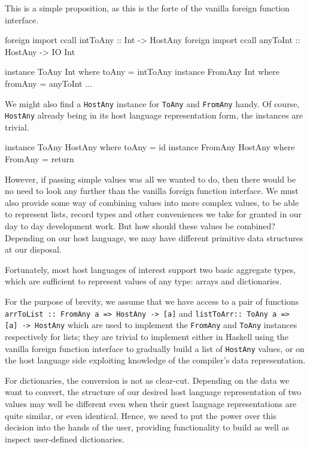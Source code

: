 \documentclass{sigplanconf}
\begin{document}
This is a simple proposition, as this is the forte of the vanilla foreign
function interface.

\begin{code}
  foreign import ccall intToAny :: Int -> HostAny
  foreign import ccall anyToInt :: HostAny -> IO Int

  instance ToAny Int where toAny = intToAny
  instance FromAny Int where fromAny = anyToInt
  ...
\end{code}

We might also find a \lstinline!HostAny! instance for \lstinline!ToAny!
and \lstinline!FromAny! handy. Of course, \lstinline!HostAny! already being
in its host language representation form, the instances are trivial.

\begin{code}
  instance ToAny HostAny where toAny = id
  instance FromAny HostAny where FromAny = return
\end{code}

However, if passing simple values was all we wanted to do, then there would be
no need to look any further than the vanilla foreign function interface.
We must also provide some way of combining values into more complex values,
to be able to represent lists, record types and other conveniences we take for
granted in our day to day development work.
But how should these values be combined? Depending on our host language, we
may have different primitive data structures at our disposal.

Fortunately, most host languages of interest support two basic aggregate types,
which are sufficient to represent values of any type: arrays and dictionaries.

For the purpose of brevity, we assume that we have
access to a pair of functions
\lstinline!arrToList :: FromAny a => HostAny -> [a]!
and \lstinline!listToArr:: ToAny a => [a] -> HostAny!
which are used to implement the \lstinline!FromAny! and \lstinline!ToAny!
instances respectively for lists;
they are trivial to implement either in Haskell using the vanilla foreign
function interface to gradually build a list of \lstinline!HostAny! values,
or on the host language side exploiting knowledge of the compiler's
data representation.

For dictionaries, the conversion is not as clear-cut. Depending on the data
we want to convert, the structure of our desired host language representation
of two values may well be different even when their guest language
representations are quite similar, or even identical.
Hence, we need to put the power over this decision into the hands of the user,
providing functionality to build as well as inspect user-defined dictionaries.
\end{document}

